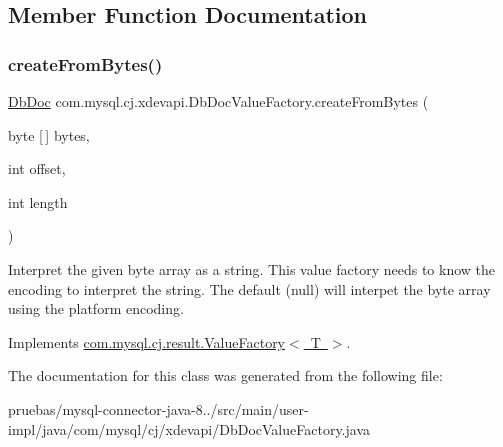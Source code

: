 \subsection{Member Function Documentation}
\mbox{\label{classcom_1_1mysql_1_1cj_1_1xdevapi_1_1_db_doc_value_factory_a9c915537c139a6430520b8a0b92d461e}} 
\subsubsection{\texorpdfstring{create\+From\+Bytes()}{createFromBytes()}}
{\footnotesize\ttfamily \mbox{\hyperlink{interfacecom_1_1mysql_1_1cj_1_1xdevapi_1_1_db_doc}{Db\+Doc}} com.\+mysql.\+cj.\+xdevapi.\+Db\+Doc\+Value\+Factory.\+create\+From\+Bytes (\begin{DoxyParamCaption}\item[{byte \mbox{[}$\,$\mbox{]}}]{bytes,  }\item[{int}]{offset,  }\item[{int}]{length }\end{DoxyParamCaption})}

Interpret the given byte array as a string. This value factory needs to know the encoding to interpret the string. The default (null) will interpet the byte array using the platform encoding. 

Implements \mbox{\hyperlink{interfacecom_1_1mysql_1_1cj_1_1result_1_1_value_factory}{com.\+mysql.\+cj.\+result.\+Value\+Factory$<$ T $>$}}.



The documentation for this class was generated from the following file\+:\begin{DoxyCompactItemize}
\item 
pruebas/mysql-\/connector-\/java-\/8../src/main/user-\/impl/java/com/mysql/cj/xdevapi/Db\+Doc\+Value\+Factory.\+java\end{DoxyCompactItemize}
